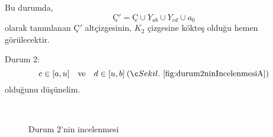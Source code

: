 \documentclass[11pt]{amsbook}
\begin{document}
Bu durumda,
\[
	Ç' = Ç \cup Y_{ab} \cup Y_{cd} \cup a_0
\]
olarak tanımlanan $Ç'$ altçizgesinin, $K_2$ çizgesine kökteş olduğu hemen görülecektir.

Durum 2:
\[
	c \in [ a, u ] \quad \text{ve} \quad d \in [ u, b ] \: (\reffig{fig:durum2ninIncelenmesiA})
\]
olduğunu düşünelim.

\begin{figure}[htb]
	\centering
  \hspace*{0.2\linewidth}
	\\

  \hspace*{0.2\linewidth}
	\caption{Durum 2'nin incelenmesi}
\end{figure}
\end{document}
